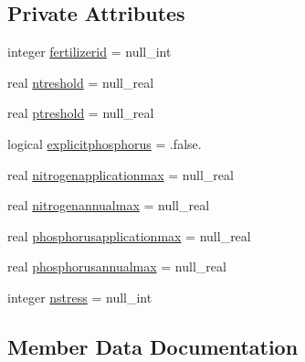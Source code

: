\subsection*{Private Attributes}
\begin{DoxyCompactItemize}
\item 
integer \mbox{\hyperlink{structmodulevegetation_1_1t__autofertilization_add5816151a54ef91f9d489476e1a6044}{fertilizerid}} = null\+\_\+int
\item 
real \mbox{\hyperlink{structmodulevegetation_1_1t__autofertilization_a471ac8456c7e2a43056ba712c2449ce1}{ntreshold}} = null\+\_\+real
\item 
real \mbox{\hyperlink{structmodulevegetation_1_1t__autofertilization_abe2dbd3056b66f446c8145565b2e9fdc}{ptreshold}} = null\+\_\+real
\item 
logical \mbox{\hyperlink{structmodulevegetation_1_1t__autofertilization_a34e13fb2cf449610d33810ce3ad6def3}{explicitphosphorus}} = .false.
\item 
real \mbox{\hyperlink{structmodulevegetation_1_1t__autofertilization_a615dfd08bee9dc8ac66376e6b00aeeaf}{nitrogenapplicationmax}} = null\+\_\+real
\item 
real \mbox{\hyperlink{structmodulevegetation_1_1t__autofertilization_a7d29e3659d33a51525a780ae4a2d55af}{nitrogenannualmax}} = null\+\_\+real
\item 
real \mbox{\hyperlink{structmodulevegetation_1_1t__autofertilization_aaae7f970eb92b58f7f77dce81a27ab64}{phosphorusapplicationmax}} = null\+\_\+real
\item 
real \mbox{\hyperlink{structmodulevegetation_1_1t__autofertilization_a82f73036564a91f7a36555a6bc22c1a2}{phosphorusannualmax}} = null\+\_\+real
\item 
integer \mbox{\hyperlink{structmodulevegetation_1_1t__autofertilization_a3c30d0e3a7260c3990d9725110603550}{nstress}} = null\+\_\+int
\end{DoxyCompactItemize}


\subsection{Member Data Documentation}
\mbox{\label{structmodulevegetation_1_1t__autofertilization_a34e13fb2cf449610d33810ce3ad6def3}} 
